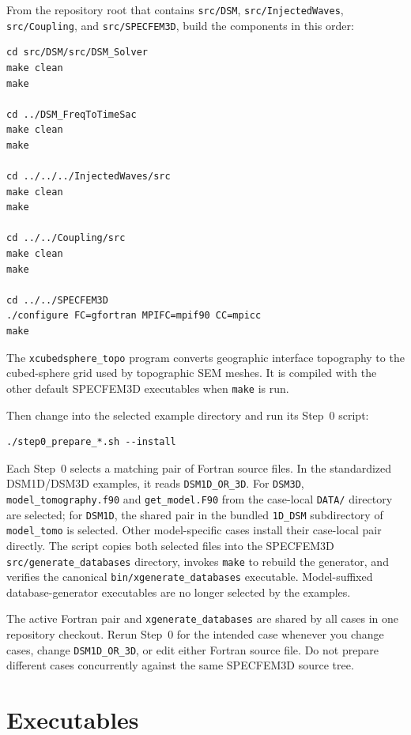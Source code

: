 \documentclass[11pt,oneside]{book}
\DeclareRobustCommand{\code}[1]{\nolinkurl{#1}}
\begin{document}
From the repository root that contains \code{src/DSM}, \code{src/InjectedWaves},
\code{src/Coupling}, and \code{src/SPECFEM3D}, build the components in this
order:
\begin{lstlisting}
cd src/DSM/src/DSM_Solver
make clean
make

cd ../DSM_FreqToTimeSac
make clean
make

cd ../../../InjectedWaves/src
make clean
make

cd ../../Coupling/src
make clean
make

cd ../../SPECFEM3D
./configure FC=gfortran MPIFC=mpif90 CC=mpicc
make
\end{lstlisting}

The \code{xcubedsphere_topo} program converts geographic interface topography
to the cubed-sphere grid used by topographic SEM meshes. It is compiled with
the other default SPECFEM3D executables when \code{make} is run.

Then change into the selected example directory and run its Step~0 script:
\begin{lstlisting}
./step0_prepare_*.sh --install
\end{lstlisting}
Each Step~0 selects a matching pair of Fortran source files. In the standardized
DSM1D/DSM3D examples, it reads \code{DSM1D_OR_3D}. For \code{DSM3D}, \code{model_tomography.f90} and \code{get_model.F90}
from the case-local \code{DATA/} directory are selected; for \code{DSM1D}, the shared pair in the bundled \code{1D_DSM} subdirectory of
\code{model_tomo} is selected. Other model-specific cases
install their case-local pair directly. The script copies both selected files
into the SPECFEM3D \code{src/generate_databases} directory, invokes
\code{make} to rebuild the generator, and verifies the canonical
\code{bin/xgenerate_databases} executable. Model-suffixed database-generator
executables are no longer selected by the examples.

The active Fortran pair and \code{xgenerate_databases} are shared by all cases
in one repository checkout. Rerun Step~0 for the intended case whenever you
change cases, change \code{DSM1D_OR_3D}, or edit either Fortran source file.
Do not prepare different cases concurrently against the same SPECFEM3D source
tree.

\section{Executables}
\end{document}
